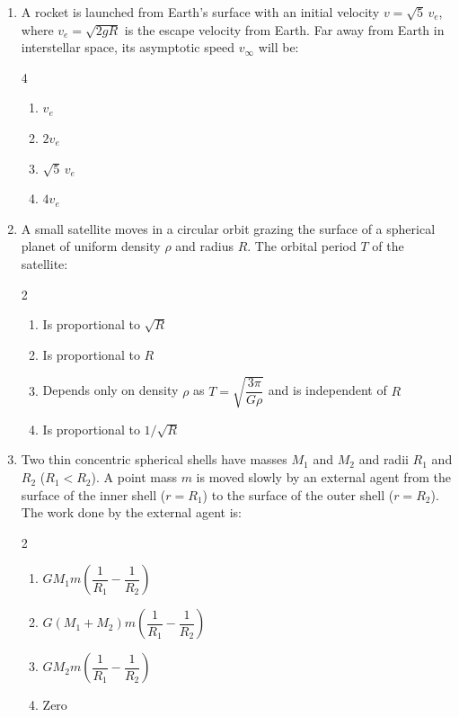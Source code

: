 \documentclass[11pt,a4paper]{article}
\begin{document}
\begin{enumerate}[label=\textbf{\arabic*.},leftmargin=18pt,itemsep=10pt]
  \item A rocket is launched from Earth's surface with an initial velocity $v = \sqrt{5}\,v_e$, where $v_e = \sqrt{2gR}$ is the escape velocity from Earth. Far away from Earth in interstellar space, its asymptotic speed $v_\infty$ will be:
  \begin{multicols}{4}
    \begin{enumerate}[label=(\Alph*)]
      \item $v_e$
      \item $2 v_e$
      \item $\sqrt{5}\,v_e$
      \item $4 v_e$
    \end{enumerate}
  \end{multicols}

  \item A small satellite moves in a circular orbit grazing the surface of a spherical planet of uniform density $\rho$ and radius $R$. The orbital period $T$ of the satellite:
  \begin{multicols}{2}
    \begin{enumerate}[label=(\Alph*)]
      \item Is proportional to $\sqrt{R}$
      \item Is proportional to $R$
      \item Depends only on density $\rho$ as $T = \sqrt{\dfrac{3\pi}{G\rho}}$ and is independent of $R$
      \item Is proportional to $1/\sqrt{R}$
    \end{enumerate}
  \end{multicols}

  \item Two thin concentric spherical shells have masses $M_1$ and $M_2$ and radii $R_1$ and $R_2$ ($R_1 < R_2$). A point mass $m$ is moved slowly by an external agent from the surface of the inner shell ($r = R_1$) to the surface of the outer shell ($r = R_2$). The work done by the external agent is:
  \begin{multicols}{2}
    \begin{enumerate}[label=(\Alph*)]
      \item $G M_1 m \left(\dfrac{1}{R_1} - \dfrac{1}{R_2}\right)$
      \item $G (M_1 + M_2) m \left(\dfrac{1}{R_1} - \dfrac{1}{R_2}\right)$
      \item $G M_2 m \left(\dfrac{1}{R_1} - \dfrac{1}{R_2}\right)$
      \item $\text{Zero}$
    \end{enumerate}
  \end{multicols}


\end{enumerate}
\end{document}
